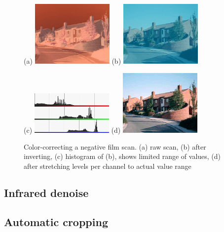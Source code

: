 \documentclass{article}
\begin{document}
\begin{figure}[H]
  \centering
  (a) \includegraphics[width=4cm]{images/imgop_color1.jpg} \hspace{0.5cm}
  (b) \includegraphics[width=4cm]{images/imgop_color2.jpg}
  
  (c) \includegraphics[width=4cm]{images/imgop_color_h.jpg} \hspace{0.5cm}
  (d) \includegraphics[width=4cm]{images/imgop_color3.jpg}
  \caption{Color-correcting a negative film scan. (a) raw scan, (b) after inverting, 
           (c) histogram of (b), shows limited range of values, (d) after stretching levels per channel
           to actual value range}
\end{figure}

\subsection{Infrared denoise}

\subsection{Automatic cropping}

\pagebreak
\end{document}
